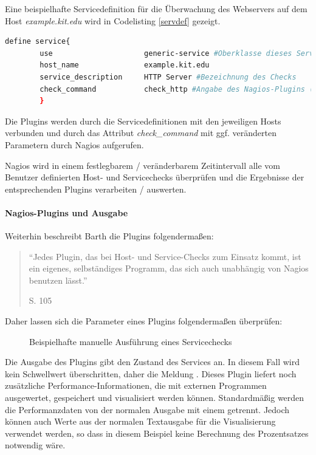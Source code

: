 Eine beispielhafte Servicedefinition für die Überwachung des Webservers auf dem Host \textit{example.kit.edu} wird in Codelisting \ref{servdef} gezeigt.

\begin{lstlisting}[captionpos=b, caption=Verkürzte Definition eines Hostobjektes, label=servdef, breaklines = true, language=sh]
define service{
        use                     generic-service #Oberklasse dieses Service-Objektes
        host_name               example.kit.edu
        service_description     HTTP Server #Bezeichnung des Checks
        check_command           check_http #Angabe des Nagios-Plugins (hier ohne Parameter)
        }

\end{lstlisting}

Die Plugins werden durch die Servicedefinitionen mit den jeweiligen Hosts verbunden und durch das Attribut \textit{check\_command} mit ggf. veränderten Parametern durch Nagios aufgerufen.

Nagios wird in einem festlegbarem / veränderbarem Zeitintervall alle vom Benutzer definierten Host- und Servicechecks überprüfen und die Ergebnisse der entsprechenden Plugins verarbeiten / auswerten.
\paragraph{Nagios-Plugins und Ausgabe}
Weiterhin beschreibt Barth die Plugins folgendermaßen:
\begin{quote}"`Jedes Plugin, das bei Host- und Service-Checks zum Einsatz kommt, ist ein eigenes, selbständiges Programm, das sich auch unabhängig von Nagios benutzen lässt."' \begin{flushright}\cite{Barth08} S. 105\end{flushright}\end{quote} 

Daher lassen sich die Parameter eines Plugins folgendermaßen überprüfen:

\begin{figure}[ht]
	\centering
		\caption{Beispielhafte manuelle Ausführung eines Servicechecks}
		\label{check-swap}
\end{figure}

Die Ausgabe des Plugins gibt den Zustand des Services an.
In diesem Fall wird kein Schwellwert überschritten, daher die Meldung .
Dieses Plugin liefert noch zusätzliche Performance-Informationen, die mit externen Programmen ausgewertet, gespeichert und visualisiert werden können.
Standardmäßig werden die Performanzdaten von der normalen Ausgabe mit einem \pictext{|} getrennt.
Jedoch können auch Werte aus der normalen Textausgabe für die Visualisierung verwendet werden, so dass in diesem Beispiel keine Berechnung des Prozentsatzes notwendig wäre.

